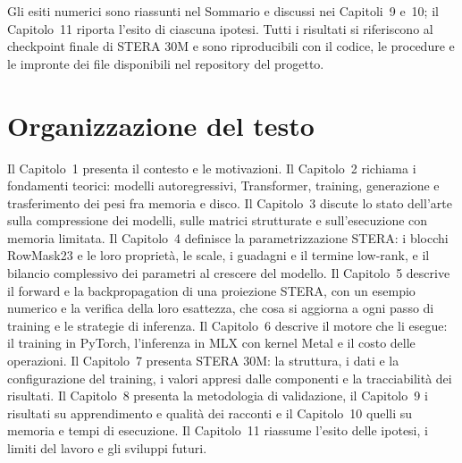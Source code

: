 Gli esiti numerici sono riassunti nel Sommario e discussi nei Capitoli~9 e~10; il Capitolo~11 riporta l'esito di ciascuna ipotesi. Tutti i risultati si riferiscono al checkpoint finale di STERA 30M e sono riproducibili con il codice, le procedure e le impronte dei file disponibili nel repository del progetto.

\section*{Organizzazione del testo}

Il Capitolo~1 presenta il contesto e le motivazioni. Il Capitolo~2 richiama i fondamenti teorici: modelli autoregressivi, Transformer, training, generazione e trasferimento dei pesi fra memoria e disco. Il Capitolo~3 discute lo stato dell'arte sulla compressione dei modelli, sulle matrici strutturate e sull'esecuzione con memoria limitata. Il Capitolo~4 definisce la parametrizzazione STERA: i blocchi RowMask23 e le loro proprietà, le scale, i guadagni e il termine low-rank, e il bilancio complessivo dei parametri al crescere del modello. Il Capitolo~5 descrive il forward e la backpropagation di una proiezione STERA, con un esempio numerico e la verifica della loro esattezza, che cosa si aggiorna a ogni passo di training e le strategie di inferenza. Il Capitolo~6 descrive il motore che li esegue: il training in PyTorch, l'inferenza in MLX con kernel Metal e il costo delle operazioni. Il Capitolo~7 presenta STERA 30M: la struttura, i dati e la configurazione del training, i valori appresi dalle componenti e la tracciabilità dei risultati. Il Capitolo~8 presenta la metodologia di validazione, il Capitolo~9 i risultati su apprendimento e qualità dei racconti e il Capitolo~10 quelli su memoria e tempi di esecuzione. Il Capitolo~11 riassume l'esito delle ipotesi, i limiti del lavoro e gli sviluppi futuri.
